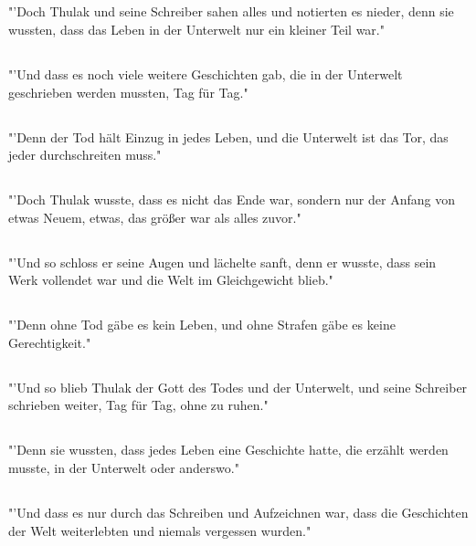 \documentclass{article}
\begin{document}
\subsection{}
"'Doch Thulak und seine Schreiber sahen alles und notierten es nieder, denn sie wussten, dass das Leben in der Unterwelt nur ein kleiner Teil war."
\subsection{}
"'Und dass es noch viele weitere Geschichten gab, die in der Unterwelt geschrieben werden mussten, Tag für Tag."
\subsection{}
"'Denn der Tod hält Einzug in jedes Leben, und die Unterwelt ist das Tor, das jeder durchschreiten muss."
\subsection{}
"'Doch Thulak wusste, dass es nicht das Ende war, sondern nur der Anfang von etwas Neuem, etwas, das größer war als alles zuvor."
\subsection{}
"'Und so schloss er seine Augen und lächelte sanft, denn er wusste, dass sein Werk vollendet war und die Welt im Gleichgewicht blieb."
\subsection{}
"'Denn ohne Tod gäbe es kein Leben, und ohne Strafen gäbe es keine Gerechtigkeit."
\subsection{}
"'Und so blieb Thulak der Gott des Todes und der Unterwelt, und seine Schreiber schrieben weiter, Tag für Tag, ohne zu ruhen."
\subsection{}
"'Denn sie wussten, dass jedes Leben eine Geschichte hatte, die erzählt werden musste, in der Unterwelt oder anderswo."
\subsection{}
"'Und dass es nur durch das Schreiben und Aufzeichnen war, dass die Geschichten der Welt weiterlebten und niemals vergessen wurden."
\end{document}
